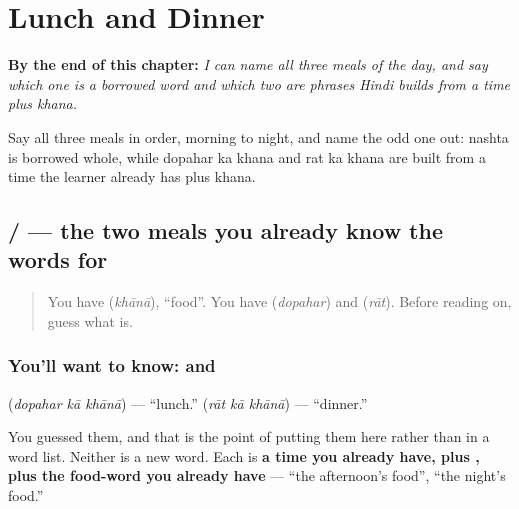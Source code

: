 
\chapter{Lunch and Dinner}
\label{ch:hi-dopahar-raat-ka-khana}

\begin{chapteropening}
\textbf{By the end of this chapter:} \emph{I can name all three meals of the day, and say which one is a borrowed word and which two are phrases Hindi builds from a time plus khana.}

Say all three meals in order, morning to night, and name the odd one out: nashta is borrowed whole, while dopahar ka khana and rat ka khana are built from a time the learner already has plus khana.
\end{chapteropening}

\section[\texorpdfstring{\hi{दोपहर} \hi{का} \hi{खाना} … (dopahar kā khānā …)}{दोपहर का खाना … (dopahar kā khānā …)}]{   /    — the two meals you already know the words for}

\label{lesson:HI-C79-dopahar-raat-ka-khana}



\begin{quote}
You have \textbf{} (\emph{khānā}), \textquotedblleft{}food\textquotedblright{}. You have \textbf{} (\emph{dopahar}) and \textbf{} (\emph{rāt}). Before reading on, guess what \textbf{  } is.
\end{quote}

\subsection*{You'll want to know:    and   }
\textbf{  } (\emph{dopahar kā khānā}) — \textquotedblleft{}lunch.\textquotedblright{} \textbf{  } (\emph{rāt kā khānā}) — \textquotedblleft{}dinner.\textquotedblright{}

You guessed them, and that is the point of putting them here rather than in a word list. Neither is a new word. Each is \textbf{a time you already have, plus , plus the food-word you already have} — \textquotedblleft{}the afternoon's food\textquotedblright{}, \textquotedblleft{}the night's food.\textquotedblright{}

